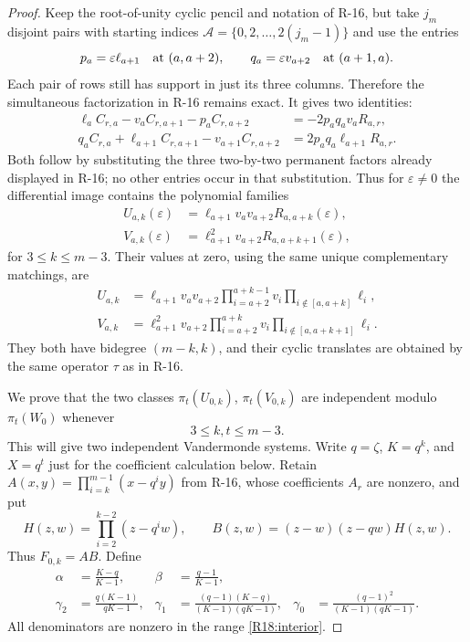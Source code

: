 \begin{proof}
Keep the root-of-unity cyclic pencil and notation of R-16,
but take $j_m$ disjoint pairs with starting indices
$\mathcal A=\{0,2,\ldots,2(j_m-1)\}$ and use the entries
\[
 p_a=\varepsilon\ell_{a+1}\quad\hbox{at }(a,a+2),
 \qquad q_a=\varepsilon v_{a+2}\quad\hbox{at }(a+1,a).
\]
Each pair of rows still has support in just its three
columns. Therefore the simultaneous factorization in
R-16 remains exact. It gives two identities:
\begin{align*}
 \ell_a C_{r,a}-v_a C_{r,a+1}-p_a C_{r,a+2}
    &=-2p_aq_a v_a R_{a,r},\\
 q_a C_{r,a}+\ell_{a+1} C_{r,a+1}-v_{a+1} C_{r,a+2}
    &= 2p_aq_a\ell_{a+1}R_{a,r}.
\end{align*}
Both follow by substituting the three two-by-two permanent
factors already displayed in R-16; no other entries occur
in that substitution. Thus for $\varepsilon\ne0$ the
differential image contains the polynomial families
\[
 \begin{aligned}
 U_{a,k}(\varepsilon)
    &=\ell_{a+1}v_a v_{a+2}R_{a,a+k}(\varepsilon),\\
 V_{a,k}(\varepsilon)
    &=\ell_{a+1}^2v_{a+2}R_{a,a+k+1}(\varepsilon),
 \end{aligned}
\]
for $3\leq k\leq m-3$. Their values at zero, using the
same unique complementary matchings, are
\[
 \begin{aligned}
 U_{a,k}&=\ell_{a+1}v_a v_{a+2}
          \prod_{i=a+2}^{a+k-1}v_i
          \prod_{i\notin[a,a+k]}\ell_i,\\
 V_{a,k}&=\ell_{a+1}^2v_{a+2}
          \prod_{i=a+2}^{a+k}v_i
          \prod_{i\notin[a,a+k+1]}\ell_i.
 \end{aligned}
\]
They both have bidegree $(m-k,k)$, and their cyclic
translates are obtained by the same operator $\tau$ as
in R-16.

We prove that the two classes
$\pi_t(U_{0,k})$, $\pi_t(V_{0,k})$ are independent
modulo $\pi_t(W_0)$ whenever
\begin{equation}\label{R18:interior}
 3\leq k,t\leq m-3.
\end{equation}
This will give two independent Vandermonde systems.
Write $q=\zeta$, $K=q^k$, and $X=q^t$ just for the
coefficient calculation below. Retain
$A(x,y)=\prod_{i=k}^{m-1}(x-q^iy)$ from R-16, whose
coefficients $A_r$ are nonzero, and put
\[
 H(z,w)=\prod_{i=2}^{k-2}(z-q^iw),\qquad
 B(z,w)=(z-w)(z-qw)H(z,w).
\]
Thus $F_{0,k}=AB$. Define
\[
 \begin{aligned}
 \alpha&=\frac{K-q}{K-1},&
 \beta&=\frac{q-1}{K-1},\\
 \gamma_2&=\frac{q(K-1)}{qK-1},&
 \gamma_1&=\frac{(q-1)(K-q)}{(K-1)(qK-1)},&
 \gamma_0&=\frac{(q-1)^2}{(K-1)(qK-1)}.
 \end{aligned}
\]
All denominators are nonzero in the range
\eqref{R18:interior}.


\end{proof}
